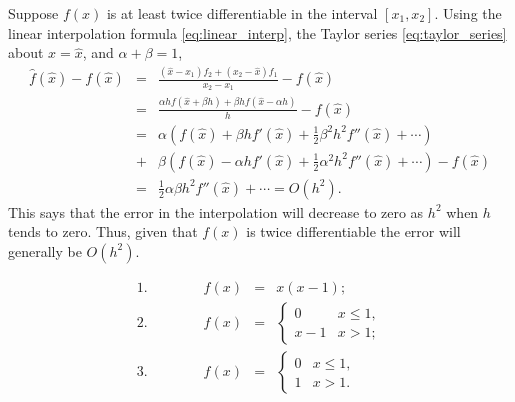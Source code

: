 Suppose $f(x)$ is at least twice differentiable in the interval $[x_1 , x_{2}]$.
Using the linear interpolation formula \eqref{eq:linear_interp}, the Taylor
series \eqref{eq:taylor_series} about $x = \hat{x}$, and $\alpha+\beta=1$, 
\begin{eqnarray}
\hat{f}(\hat{x}) - f(\hat{x}) & = &
\frac{(\hat{x} - x_1) f_{2} + (x_{2} - \hat{x}) f_1}{x_{2} - x_1}
-
f(\hat{x})
\nonumber \\
& = &
\frac{\alpha h f(\hat{x} + \beta h ) + \beta h f(\hat{x} - \alpha h)}{h}
- f(\hat{x})
\nonumber \\
& = &
\alpha       \left( f(\hat{x}) + \beta h  f'(\hat{x}) + \tfrac{1}{2} \beta^2 h^2 f''(\hat{x}) +  \cdots \right)
\nonumber \\
& + &
\beta \left( f(\hat{x}) - \alpha h f'(\hat{x}) + \tfrac{1}{2} \alpha^2 h^2 f''(\hat{x}) + \cdots \right)
- f(\hat{x})
\nonumber \\
& = &
\tfrac{1}{2}  \alpha  \beta  h^2 f''(\hat{x}) +  \cdots = O(h^2). 
\end{eqnarray}
This says that the error in the interpolation will decrease to zero
as  $h^2$ when $h$ tends to zero. Thus, given that $f(x)$ is twice
differentiable the error will generally be $O(h^2)$. 



\vspace{-2mm}
\begin{eqnarray}
1. \qquad \qquad f(x) & = & x(x - 1) ;
\nonumber \\
2. \qquad \qquad f(x) & = & 
\left\{
\begin{array}{ll}
0     & x \le 1 , \\
x - 1 & x > 1 ;
\end{array}
\right.
\nonumber \\
3. \qquad \qquad f(x) & = & 
\left\{
\begin{array}{ll}
0     & x \le 1 , \\
1     & x > 1 .
\end{array}
\right.
\nonumber
\end{eqnarray}

